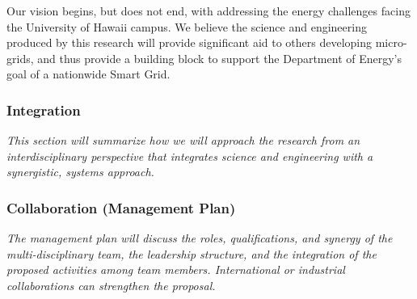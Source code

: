 Our vision begins, but does not end, with addressing the energy challenges
facing the University of Hawaii campus.  We believe the science and
engineering produced by this research will provide significant aid to
others developing micro-grids, and thus provide a building block to support
the Department of Energy's goal of a nationwide Smart Grid.

\subsubsection{Integration}

{\em This section will summarize how we will approach the research from an
  interdisciplinary perspective that integrates science and engineering
  with a synergistic, systems approach.}



\subsubsection{Collaboration (Management Plan)}

{\em The management plan will discuss the roles, qualifications, and
  synergy of the multi-disciplinary team, the leadership structure, and the
  integration of the proposed activities among team members.  
  International or industrial collaborations can strengthen the proposal.
}


